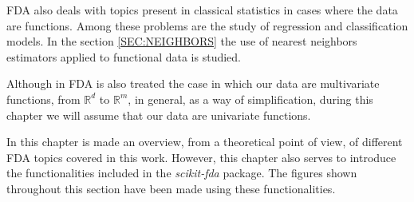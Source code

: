 FDA also deals with topics present in classical statistics in cases where the
data are functions. Among these problems are the study of regression and
classification models. In the section \ref{SEC:NEIGHBORS} the use of nearest
neighbors estimators applied to functional data is studied.

Although in FDA is also treated the case in which our data are multivariate
functions, from  $\mathbb{R}^d$ to $\mathbb{R}^m$, in general, as a way of
simplification, during this chapter we will assume that our data are
univariate functions.

In this chapter is made an overview, from a theoretical point of view, of
different FDA topics covered in this work. However, this chapter also serves
to introduce the functionalities included in the \textit{scikit-fda} package.
The figures shown throughout this section have been made using these functionalities.
